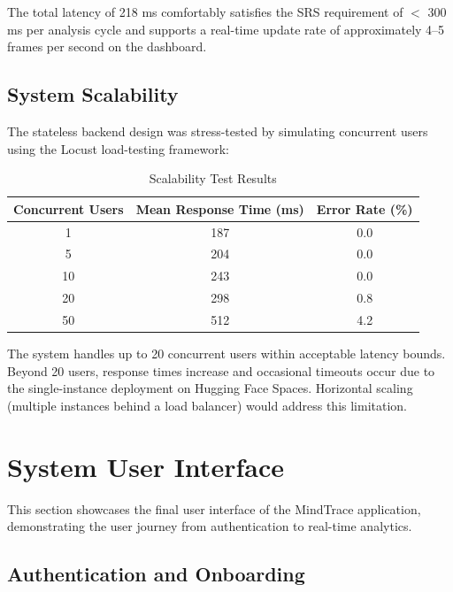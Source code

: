 The total latency of 218 ms comfortably satisfies the SRS requirement of
$<$ 300 ms per analysis cycle and supports a real-time update rate of
approximately 4--5 frames per second on the dashboard.

\subsection{System Scalability}

The stateless backend design was stress-tested by simulating concurrent
users using the Locust load-testing framework:

\begin{table}[H]
\centering
\caption{Scalability Test Results}
\begin{tabular}{ccc}
\toprule
\textbf{Concurrent Users} & \textbf{Mean Response Time (ms)} & \textbf{Error Rate (\%)} \\
\midrule
1                         & 187                              & 0.0 \\
5                         & 204                              & 0.0 \\
10                        & 243                              & 0.0 \\
20                        & 298                              & 0.8 \\
50                        & 512                              & 4.2 \\
\bottomrule
\end{tabular}
\end{table}

The system handles up to 20 concurrent users within acceptable latency bounds.
Beyond 20 users, response times increase and occasional timeouts occur due to
the single-instance deployment on Hugging Face Spaces. Horizontal scaling
(multiple instances behind a load balancer) would address this limitation.

\section{System User Interface}

This section showcases the final user interface of the MindTrace application,
demonstrating the user journey from authentication to real-time analytics.

\subsection{Authentication and Onboarding}

